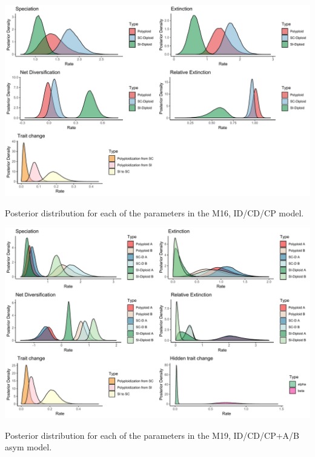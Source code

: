 \begin{suppfigure}
\includegraphics[width=\textwidth]{musseDPSInodipposteriordist.pdf}
\caption{Posterior distribution for each of the parameters in the  M16, ID/CD/CP model.} %
\label{suppfigure:IDCDCPnodip}
\end{suppfigure}

\begin{suppfigure}
\includegraphics[width=\textwidth]{muhissenodipasymposteriordist.pdf}
\caption{Posterior distribution for each of the parameters in the M19, ID/CD/CP+A/B asym model.} %
\label{suppfigure:IDCDCPnodipAB}
\end{suppfigure}

